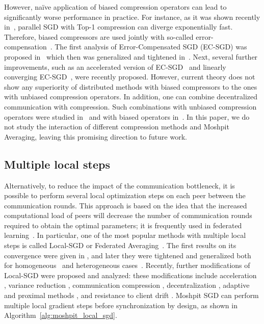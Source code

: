 However, naïve application of biased compression operators can lead to significantly worse performance in practice. For instance, as it was shown recently in~\cite{beznosikov2020biased}, parallel SGD with Top-1 compression can diverge exponentially fast. Therefore, biased compressors are used jointly with so-called error-compensation~\cite{seide20141}. The first analysis of Error-Compensated SGD (EC-SGD) was proposed in~\cite{stich2018sparsified,karimireddy2019error} which then was generalized and tightened in~\cite{beznosikov2020biased}. Next, several further improvements, such as an accelerated version of EC-SGD~\cite{qian2020error} and linearly converging EC-SGD~\cite{gorbunov2020linearly}, were recently proposed. However, current theory does not show any superiority of distributed methods with biased compressors to the ones with unbiased compression operators.
In addition, one can combine decentralized communication with compression. Such combinations with unbiased compression operators were studied in~\cite{reisizadeh2019exact,kovalev2020linearly} and with biased operators in~\cite{pmlr-v97-koloskova19a,Koloskova2020Decentralized}.
In this paper, we do not study the interaction of different compression methods and Moshpit Averaging, leaving this promising direction to future work.

\subsection{Multiple local steps}
Alternatively, to reduce the impact of the communication bottleneck, it is possible to perform several local optimization steps on each peer between the communication rounds.
This approach is based on the idea that the increased computational load of peers will decrease the number of communication rounds required to obtain the optimal parameters; it is frequently used in federated learning~\cite{konevcny2016federated,kairouz2019advances}. In particular, one of the most popular methods with multiple local steps is called Local-SGD or Federated Averaging~\cite{konevcny2016federated,Stich18local}. The first results on its convergence were given in \cite{Stich18local,LinSPJ2018local}, and later they were tightened and generalized both for homogeneous~\cite{khaled2020tighter,woodworth2020local} and heterogeneous  cases~\cite{khaled2020tighter,woodworth2020minibatch}. Recently, further modifications of Local-SGD were proposed and analyzed: these modifications include acceleration \cite{yuan2020federated}, variance reduction \cite{gorbunov2020local}, communication compression \cite{basu2019qsparse,haddadpour2020federated,das2020improved}, decentralization \cite{li2019communication,koloskova2020unified}, adaptive and proximal methods \cite{reddi2021adaptive,yuan2020federated_comp}, and resistance to client drift \cite{karimireddy2020scaffold}.
Moshpit SGD can perform multiple local gradient steps before synchronization by design, as shown in Algorithm~\ref{alg:moshpit_local_sgd}.


